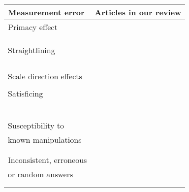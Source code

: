 \begin{table}
	\centering
	\begin{tabular}{ll}
		\toprule
		Measurement error & Articles in our review\\
		\midrule
		Primacy effect & \cite{erens_comparing_2019, wells_comparison_2014}\\
    	& \cite{mavletova_data_2013, lugtig_use_2016}\\
    	& \cite{tourangeau_web_2017}\\
    	& \cite{toepoel_what_2014}\\
    	Straightlining & \cite{erens_comparing_2019, mavletova_grid_2018}\\
    	& \cite{lugtig_recruiting_2019, struminskaya_effects_2015}\\
    	& \cite{lugtig_use_2016}\\
    	& \cite{tourangeau_web_2018}\\
    	& \cite{keusch_web_2017}\\
    	Scale direction effects & \cite{krebs_exploring_2021}\\
    	& \cite{tourangeau_web_2018}\\
    	Satisficing & \cite{revilla_experiment_2017, erens_comparing_2019}\\
    	& \cite{revilla_comparing_2018, mavletova_data_2013}\\
    	& \cite{daikeler_motivated_2020, lugtig_recruiting_2019}\\
    	& \cite{toepoel_sliders_2018}\\
    	& \cite{struminskaya_effects_2015}\\
    	& \cite{lugtig_use_2016}\\
    	& \cite{keusch_web_2017}\\
    	Susceptibility to  & \cite{wells_comparison_2014, hartman_does_2019}\\
    	known manipulations & \cite{peytchev_experiments_2010}\\
    	& \cite{tourangeau_web_2017}\\
    	& \cite{keusch_web_2017}\\
    	Inconsistent, erroneous & \cite{revilla_comparing_2018, weigold_computerized_2021}\\
    	or random answers & \cite{hartman_does_2019}\\
    	& \cite{ bosch_measurement_2019}\\
    	& \cite{antoun_simultaneous_2019, skeie_smartphone_2019}\\

\end{tabular}
\end{table}
